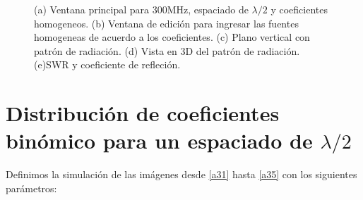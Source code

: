 \documentclass[11pt]{book}
\begin{document}
\begin{figure}[h]
	\caption{(a) Ventana principal para 300MHz, espaciado de $\lambda / 2$ y coeficientes homogeneos. (b) Ventana de edición para ingresar las fuentes homogeneas de acuerdo a los coeficientes. (c) Plano vertical con patrón de radiación. (d) Vista en 3D del patrón de radiación. (e)SWR y coeficiente de refleción.}
\end{figure}


\newpage

\section{Distribución de coeficientes binómico para un espaciado de $\lambda/2$}

Definimos la simulación de las imágenes desde \eqref{a31} hasta \eqref{a35} con los siguientes parámetros:
\end{document}
